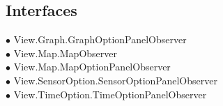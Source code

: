 {\subsection*{Interfaces}
\hspace{0.0cm} $\bullet$ View.Graph.GraphOptionPanelObserver {\tiny {}} \\
\hspace{0.0cm} $\bullet$ View.Map.MapObserver {\tiny {}} \\
\hspace{0.0cm} $\bullet$ View.Map.MapOptionPanelObserver {\tiny {}} \\
\hspace{0.0cm} $\bullet$ View.SensorOption.SensorOptionPanelObserver {\tiny {}} \\
\hspace{0.0cm} $\bullet$ View.TimeOption.TimeOptionPanelObserver {\tiny {}} \\
}
